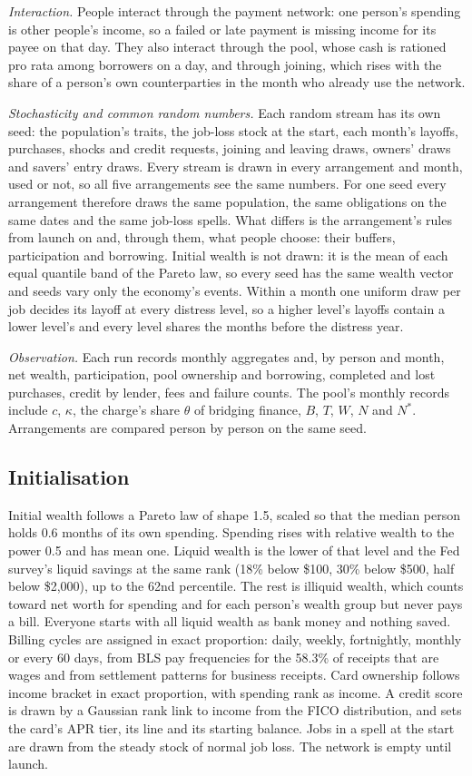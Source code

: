 \emph{Interaction.} People interact through the payment network: one person's spending is other people's income,
so a failed or late payment is missing income for its payee on that day. They also interact through the pool, whose
cash is rationed pro rata among borrowers on a day, and through joining, which rises with the share of a person's
own counterparties in the month who already use the network.

\emph{Stochasticity and common random numbers.} Each random stream has its own seed: the population's traits, the
job-loss stock at the start, each month's layoffs, purchases, shocks and credit requests, joining and leaving draws,
owners' draws and savers' entry draws. Every stream is drawn in every arrangement and month,
used or not, so all five arrangements see the same numbers. For one seed every arrangement therefore draws the same
population, the same obligations on the same dates and the same job-loss spells. What differs is the arrangement's
rules from launch on and, through them, what people choose: their buffers, participation and borrowing.
Initial wealth is not drawn: it is the mean of each equal quantile band of the Pareto law, so every seed has the same
wealth vector and seeds vary only the economy's events. Within a month one uniform draw per job decides its layoff at
every distress level, so a higher level's layoffs contain a lower level's and every level shares the months before
the distress year.

\emph{Observation.} Each run records monthly aggregates and, by person and month, net wealth, participation, pool
ownership and borrowing, completed and lost purchases, credit by lender, fees and failure counts. The pool's
monthly records include $c$, $\kappa$, the charge's share $\theta$ of bridging finance, $B$, $T$, $W$, $N$ and
$N^{*}$. Arrangements are compared person by person on the same seed.

\subsection{Initialisation}

Initial wealth follows a Pareto law of shape 1.5, scaled so that the median person holds 0.6 months of its own
spending. Spending rises with relative wealth to the power 0.5 and has mean one. Liquid wealth is the lower of that
level and the Fed survey's liquid savings at the same rank (18\% below \$100, 30\% below \$500, half below \$2,000),
up to the 62nd percentile. The rest is illiquid wealth, which counts toward net worth for spending and for each
person's wealth group but never pays a bill. Everyone starts with all liquid wealth as bank money and nothing saved.
Billing cycles are assigned in exact proportion: daily, weekly, fortnightly, monthly or every 60 days, from BLS pay
frequencies for the 58.3\% of receipts that are wages and from settlement patterns for business receipts. Card
ownership follows income bracket in exact proportion, with spending rank as income. A credit score is drawn by a
Gaussian rank link to income from the FICO distribution, and sets the card's APR tier, its line and its starting
balance. Jobs in a spell at the start are drawn from the steady stock of normal job loss. The network is empty until
launch.

